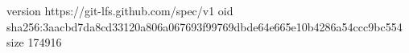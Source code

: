 version https://git-lfs.github.com/spec/v1
oid sha256:3aacbd7da8cd33120a806a067693f99769dbde64e665e10b4286a54ccc9bc554
size 174916
